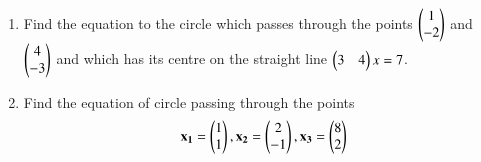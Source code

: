 \renewcommand{\theequation}{\theenumi}
\renewcommand{\thefigure}{\theenumi}
\begin{enumerate}[label=\thesubsection.\arabic*.,ref=\thesubsection.\theenumi]

\item Find the equation to the circle which passes through the points $\begin{pmatrix} 1 \\ -2 \end{pmatrix}$ and $\begin{pmatrix} 4 \\ -3 \end{pmatrix}$ and which has its centre on the straight line $\begin{pmatrix} 3 & 4 \end{pmatrix}x = 7$.
%
\\
\solution

%
%
\item Find the equation of circle passing through the points
\begin{align}
    \mathbf{x_1}=\begin{pmatrix}1\\1\end{pmatrix}, \mathbf{x_2}=\begin{pmatrix}2\\-1\end{pmatrix}, \mathbf{x_3}=\begin{pmatrix}8\\2\end{pmatrix}\label{eq:solutions/17/17/eq:0}
\end{align}
%
\\
\solution

\end{enumerate}
